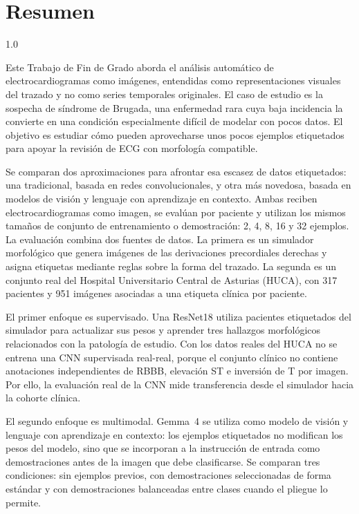 \chapter*{Resumen}

\begin{spacing}{1.0}

Este Trabajo de Fin de Grado aborda el análisis automático de electrocardiogramas como imágenes, entendidas como representaciones visuales del trazado y no como series temporales originales. El caso de estudio es la sospecha de síndrome de Brugada, una enfermedad rara cuya baja incidencia la convierte en una condición especialmente difícil de modelar con pocos datos. El objetivo es estudiar cómo pueden aprovecharse unos pocos ejemplos etiquetados para apoyar la revisión de ECG con morfología compatible.

Se comparan dos aproximaciones para afrontar esa escasez de datos etiquetados: una tradicional, basada en redes convolucionales, y otra más novedosa, basada en modelos de visión y lenguaje con aprendizaje en contexto. Ambas reciben electrocardiogramas como imagen, se evalúan por paciente y utilizan los mismos tamaños de conjunto de entrenamiento o demostración: 2, 4, 8, 16 y 32 ejemplos. La evaluación combina dos fuentes de datos. La primera es un simulador morfológico que genera imágenes de las derivaciones precordiales derechas y asigna etiquetas mediante reglas sobre la forma del trazado. La segunda es un conjunto real del Hospital Universitario Central de Asturias (HUCA), con 317 pacientes y 951 imágenes asociadas a una etiqueta clínica por paciente.

El primer enfoque es supervisado. Una ResNet18 utiliza pacientes etiquetados del simulador para actualizar sus pesos y aprender tres hallazgos morfológicos relacionados con la patología de estudio. Con los datos reales del HUCA no se entrena una CNN supervisada real-real, porque el conjunto clínico no contiene anotaciones independientes de RBBB, elevación ST e inversión de T por imagen. Por ello, la evaluación real de la CNN mide transferencia desde el simulador hacia la cohorte clínica.

El segundo enfoque es multimodal. Gemma~4 se utiliza como modelo de visión y lenguaje con aprendizaje en contexto: los ejemplos etiquetados no modifican los pesos del modelo, sino que se incorporan a la instrucción de entrada como demostraciones antes de la imagen que debe clasificarse. Se comparan tres condiciones: sin ejemplos previos, con demostraciones seleccionadas de forma estándar y con demostraciones balanceadas entre clases cuando el pliegue lo permite.


\end{spacing}
